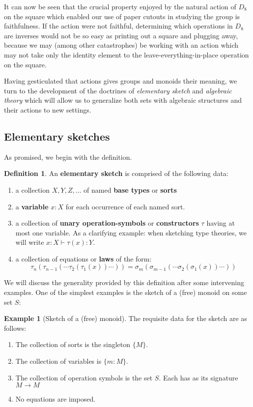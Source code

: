 \documentclass[12pt,twoside]{reedthesis}
\theoremstyle{definition}
\newtheorem{definition}{Definition}
\newtheorem{example}{Example}
\theoremstyle{remark}
\theoremstyle{plain}
\begin{document}
It can now be seen that the crucial property enjoyed by the natural action of
$D_{8}$ on the square which enabled our use of paper cutouts in studying the
group is faithfulness. If the action were not faithful, determining which
operations in $D_{8}$ are inverses would not be so easy as printing out a square
and plugging away, because we may (among other catastrophes) be working with an
action which may not take only the identity element to the
leave-everything-in-place operation on the square.

Having gesticulated that actions gives groups and monoids their meaning, we turn
to the development of the doctrines of \emph{elementary sketch} and
\emph{algebraic theory} which will allow us to generalize both sets with
algebraic structures and their actions to new settings.

\subsection{Elementary sketches}
As promised, we begin with the definition.
\begin{definition}\label{def:elem sketch}
  An \textbf{elementary sketch} is comprised of the following data:
  \begin{enumerate}
    \item a collection \(X, Y, Z, \dots \) of named \textbf{base types} or
          \textbf{sorts}
    \item a \textbf{variable} \(x:X\) for each occurrence of each named sort.
    \item a collection of \textbf{unary operation-symbols} or
          \textbf{constructors} \(\tau\) having at most one variable. As a
          clarifying example: when sketching type theories, we will write
          \( x:X \vdash \tau(x) : Y \).
    \item a collection of equations or \textbf{laws} of the
          form: \[ \tau_n (\tau_{n-1}(\cdots \tau_2 (\tau_1 (x))\cdots )) = \sigma_m (\sigma_{m-1}(\cdots \sigma_2 (\sigma_1 (x))\cdots )) \]
  \end{enumerate}
\end{definition}

We will discuss the generality provided by this definition after some
intervening examples. One of the simplest examples is the sketch of a (free)
monoid on some set $S$:

\begin{example}[Sketch of a (free) monoid]\label{ex:monoid sketch}
  The requisite data for the sketch are as follows:
  \begin{enumerate}
    \item The collection of sorts is the singleton \( \{M\} \).
    \item The collection of variables is \( \{m:M\} \).
    \item The collection of operation symbols is the set \( S \). Each has as its signature \( M \rightarrow M \)
    \item No equations are imposed.
  \end{enumerate}
\end{example}
\end{document}
